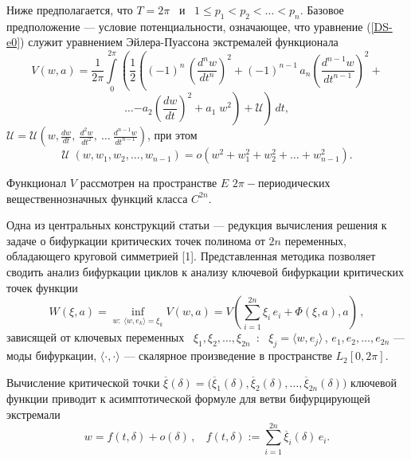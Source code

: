 
Ниже предполагается, что $T=2\pi$ \ и \ $1\leqslant p_1 < p_2<\dots <
p_n$. Базовое предположение --- условие потенциальности, означающее,
что уравнение (\ref{DS-e0}) служит уравнением Эйлера-Пуассона
экстремалей функционала
 $$
V(w,a)=\frac1{2\pi}\int\limits_0^{2\pi}\left( \frac12\left
((-1)^n\,\left(\frac{d^n w}{dt^n}\right)^2 + (-1)^{n-1}\,
a_n\left(\frac{d^{n-1} w}{dt^{n-1}}\right)^2 + \right.\right.
 $$
\begin{equation}\label{DS-e1}
\dots \left.\left. - a_2 \left(\frac{d w}{dt}\right)^2 + a_1\;
w^2\right) + \mathcal{U}\right)\,dt,
\end{equation}
$\mathcal{U}=\mathcal{U}\left(w,\frac{dw}{dt}, \ \frac{d^2w}{dt^2},
\ \dots \ \frac{d^{n-1} w}{dt^{n-1}}\right)$, при этом
$$
\mathcal{U}\;(w,w_1, w_2,\dots , w_{n-1}) = o(w^2+ w_1^2+ w_2^2+
\dots + w_{n-1}^2).
$$

Функционал $V$ рассмотрен на пространстве $E$
$2\pi-$пе\-ри\-о\-ди\-чес\-ких вещественнозначных  функций класса
$C^{2n}$.

Одна из центральных конструкций статьи --- редукция вычисления
решения к задаче о бифуркации критических точек полинома от $2n$
переменных, обладающего круговой симметрией [1]. Представленная методика позволяет сводить анализ
бифуркации циклов к анализу ключевой бифуркации критических точек
функции
\begin{equation}\label{DS-7.1}
W(\xi,a) = \inf_{w: \ \langle w,e_k \rangle =\xi_k} V(w,a) =
V\left(\sum\limits^{2n}_{i=1} \xi_i\,e_i + \Phi( \xi,a),a\right)\,,
\end{equation}
зависящей от ключевых переменных \ $\xi_1,\xi_2,\dots ,\xi_{2n}$\,
: \ $\xi_j = \langle
w,e_j\rangle$\,, $e_1,e_2,\dots ,e_{2n}$
--- моды бифуркации, $\langle \cdot,\cdot \rangle$ --- скалярное
произведение в пространстве $ L_2[0,2\pi]$.

Вычисление критической точки $\overline{\xi}(\delta) =
(\overline{\xi}_1(\delta),
\overline{\xi}_2(\delta),\dots,
$\linebreak $
\overline{\xi}_{2n}(\delta))$ ключевой функции приводит к
асимптотической формуле для ветви бифурцирующей экстремали
\begin{equation}\label{asimpt}
w = f(t,\delta) + o(\delta) \, , \ \ \ \  f(t,\delta):=
\sum\limits^{2n}_{i=1} \overline{\xi}_i(\delta)\,e_i.
\end{equation}

